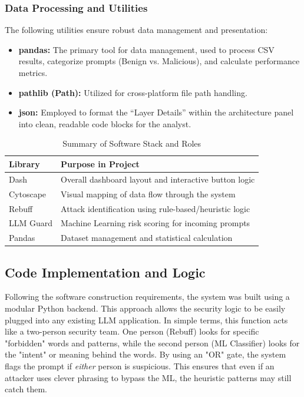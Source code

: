 \documentclass{article}
\begin{document}
\subsubsection{Data Processing and Utilities}
The following utilities ensure robust data management and presentation:
\begin{itemize}
    \item \textbf{pandas:} The primary tool for data management, used to process CSV results, categorize prompts (Benign vs. Malicious), and calculate performance metrics.
    \item \textbf{pathlib (Path):} Utilized for cross-platform file path handling.
    \item \textbf{json:} Employed to format the ``Layer Details'' within the architecture panel into clean, readable code blocks for the analyst.
\end{itemize}

\begin{table}[ht]
\caption{Summary of Software Stack and Roles}
\centering
\begin{tabular}{ll}
\toprule
\textbf{Library} & \textbf{Purpose in Project} \\
\midrule
Dash & Overall dashboard layout and interactive button logic \\
Cytoscape & Visual mapping of data flow through the system \\
Rebuff & Attack identification using rule-based/heuristic logic \\
LLM Guard & Machine Learning risk scoring for incoming prompts \\
Pandas & Dataset management and statistical calculation \\
\bottomrule
\end{tabular}
\label{tab:software_stack}
\end{table}

\subsection{Code Implementation and Logic}
Following the software construction requirements, the system was built using a modular Python backend. This approach allows the security logic to be easily plugged into any existing LLM application. In simple terms, this function acts like a two-person security team. One person (Rebuff) looks for specific "forbidden" words and patterns, while the second person (ML Classifier) looks for the "intent" or meaning behind the words. By using an "OR" gate, the system flags the prompt if \textit{either} person is suspicious. This ensures that even if an attacker uses clever phrasing to bypass the ML, the heuristic patterns may still catch them.
\end{document}
